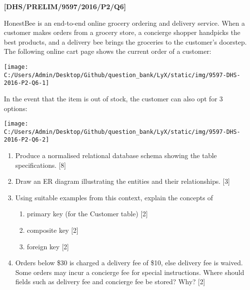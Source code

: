 \item \textbf{{[}DHS/PRELIM/9597/2016/P2/Q6{]} }

HonestBee is an end-to-end online grocery ordering and delivery service.
When a customer makes orders from a grocery store, a concierge shopper
handpicks the best products, and a delivery bee brings the groceries
to the customer's doorstep. The following online cart page shows the
current order of a customer: 
\begin{center}
\texttt{[image: C:/Users/Admin/Desktop/Github/question\_bank/LyX/static/img/9597-DHS-2016-P2-Q6-1]}
\par\end{center}

In the event that the item is out of stock, the customer can also
opt for 3 options: 
\begin{center}
\texttt{[image: C:/Users/Admin/Desktop/Github/question\_bank/LyX/static/img/9597-DHS-2016-P2-Q6-2]}
\par\end{center}
\begin{enumerate}
\item Produce a normalised relational database schema showing the table
specifications. \hfill{}{[}8{]}
\item Draw an ER diagram illustrating the entities and their relationships.
\hfill{}{[}3{]}
\item Using suitable examples from this context, explain the concepts of
\begin{enumerate}
\item primary key (for the Customer table) \hfill{}{[}2{]}
\item composite key \hfill{}{[}2{]}
\item foreign key \hfill{}{[}2{]}
\end{enumerate}
\item Orders below \$30 is charged a delivery fee of \$10, else delivery
fee is waived. Some orders may incur a concierge fee for special instructions.
Where should fields such as delivery fee and concierge fee be stored?
Why? \hfill{}{[}2{]}
\end{enumerate}